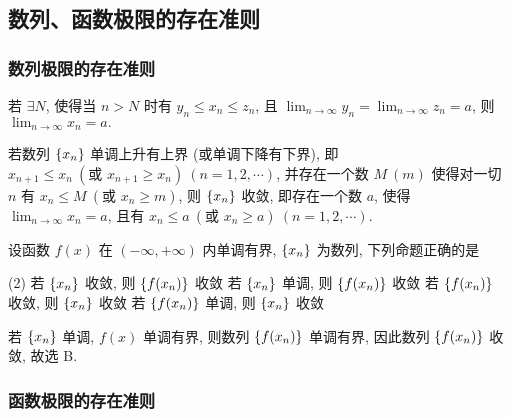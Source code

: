 \subsection{数列、函数极限的存在准则}

\subsubsection{数列极限的存在准则}

\begin{theorem}[夹逼准则]
    \label{pinchGuidelines}
    若 $\exists N$, 使得当 $n>N$ 时有 $y_n\leqslant x_n\leqslant z_n$, 且 $\displaystyle\lim_{n\to\infty}y_n=\lim_{n\to\infty}z_n=a$, 则 $\displaystyle\lim_{n\to\infty}x_n=a.$
\end{theorem}

\begin{theorem}[数列的单调有界准则]
    若数列 $\qty{x_n}$ 单调上升有上界 (或单调下降有下界), 即 $x_{n+1}\leqslant x_n~(\text{或 }x_{n+1}\geqslant x_n)~(n=1,2,\cdots)$, 并存在一个数 $M~ (m)$ 使得对一切 $n$ 有 $x_n\leqslant M~(\text{或 }x_n\geqslant m)$, 则 $\qty{x_n}$ 收敛, 即存在一个数 $a$, 使得 $\displaystyle\lim_{n\to\infty}x_n=a$, 且有 $x_n\leqslant a~(\text{或 }x_n\geqslant a)~(n=1,2,\cdots)$.
\end{theorem}

\begin{example}[2008 数一]
    设函数 $f(x)$ 在 $(-\infty,+\infty)$ 内单调有界, $\qty{x_n}$ 为数列, 下列命题正确的是 
    \begin{tasks}(2)
        \task 若 $\qty{x_n}$ 收敛, 则 $\qty{f(x_n)}$ 收敛
        \task 若 $\qty{x_n}$ 单调, 则 $\qty{f(x_n)}$ 收敛
        \task 若 $\qty{f(x_n)}$ 收敛, 则 $\qty{x_n}$ 收敛
        \task 若 $\qty{f(x_n)}$ 单调, 则 $\qty{x_n}$ 收敛
    \end{tasks}
\end{example}
\begin{solution}
    若 $\qty{x_n}$ 单调, $f(x)$ 单调有界, 则数列 $\qty{f(x_n)}$ 单调有界, 因此数列 $\qty{f(x_n)}$ 收敛, 故选 B.
\end{solution}

\subsubsection{函数极限的存在准则}

